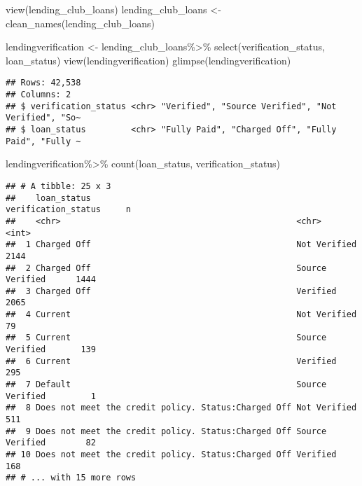 \documentclass[
]{article}
\newenvironment{Shaded}{\begin{snugshade}}{\end{snugshade}}
\newcommand{\FunctionTok}[1]{\textcolor[rgb]{0.00,0.00,0.00}{#1}}
\newcommand{\NormalTok}[1]{#1}
\newcommand{\OtherTok}[1]{\textcolor[rgb]{0.56,0.35,0.01}{#1}}
\newcommand{\SpecialCharTok}[1]{\textcolor[rgb]{0.00,0.00,0.00}{#1}}
\begin{document}
\begin{Shaded}
\begin{Highlighting}[]
\FunctionTok{view}\NormalTok{(lending\_club\_loans)}
\NormalTok{lending\_club\_loans }\OtherTok{\textless{}{-}} \FunctionTok{clean\_names}\NormalTok{(lending\_club\_loans)}
\end{Highlighting}
\end{Shaded}

\begin{Shaded}
\begin{Highlighting}[]
\NormalTok{lendingverification }\OtherTok{\textless{}{-}}\NormalTok{ lending\_club\_loans}\SpecialCharTok{\%\textgreater{}\%}
\FunctionTok{select}\NormalTok{(verification\_status, loan\_status)}
\FunctionTok{view}\NormalTok{(lendingverification)}
\FunctionTok{glimpse}\NormalTok{(lendingverification)}
\end{Highlighting}
\end{Shaded}

\begin{verbatim}
## Rows: 42,538
## Columns: 2
## $ verification_status <chr> "Verified", "Source Verified", "Not Verified", "So~
## $ loan_status         <chr> "Fully Paid", "Charged Off", "Fully Paid", "Fully ~
\end{verbatim}

\begin{Shaded}
\begin{Highlighting}[]
\NormalTok{lendingverification}\SpecialCharTok{\%\textgreater{}\%}
  \FunctionTok{count}\NormalTok{(loan\_status, verification\_status)}
\end{Highlighting}
\end{Shaded}

\begin{verbatim}
## # A tibble: 25 x 3
##    loan_status                                         verification_status     n
##    <chr>                                               <chr>               <int>
##  1 Charged Off                                         Not Verified         2144
##  2 Charged Off                                         Source Verified      1444
##  3 Charged Off                                         Verified             2065
##  4 Current                                             Not Verified           79
##  5 Current                                             Source Verified       139
##  6 Current                                             Verified              295
##  7 Default                                             Source Verified         1
##  8 Does not meet the credit policy. Status:Charged Off Not Verified          511
##  9 Does not meet the credit policy. Status:Charged Off Source Verified        82
## 10 Does not meet the credit policy. Status:Charged Off Verified              168
## # ... with 15 more rows
\end{verbatim}
\end{document}
